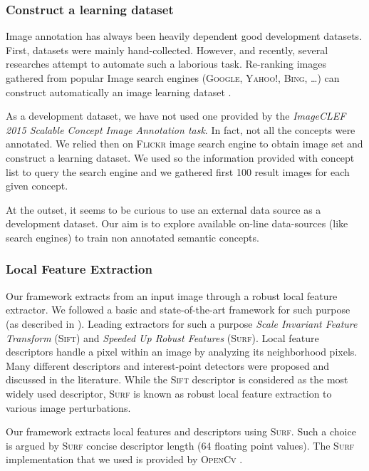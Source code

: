 			\subsubsection{Construct a learning dataset}
				\label{label1}
				Image annotation has always been heavily dependent  good development datasets. 
				First, datasets were mainly hand-collected. However, and recently, several researches 
				attempt to automate such a laborious task. Re-ranking images gathered from popular 
				Image search engines (\textsc{Google}, \textsc{Yahoo!}, \textsc{Bing}, \dots) 
				can construct automatically an image learning dataset \citep{Fergus2004,Fergus2005,Schroff2011}.

				As a development dataset, we have not used one provided by the \textit{ImageCLEF
				2015 Scalable Concept Image Annotation task}. In fact, not all the concepts were annotated. 
				We relied then on \textsc{Flickr} image search engine to obtain image set and construct 
				a learning dataset. We used so the information provided with concept list to 
				query the search engine and we gathered first 100 result images for each given concept.

				At the outset, it seems to be curious to use an external data source as a development dataset. 
				Our aim is to explore available on-line data-sources (like search engines) to train non 
				annotated semantic concepts.


			\subsubsection{Local Feature Extraction}
				Our framework extracts  from an input image through a robust local feature extractor.
				We followed a basic and state-of-the-art framework for such purpose (as described in \citep{Piras2014}).
				Leading extractors for such a purpose  \textit{Scale Invariant Feature 
				Transform} (\textsc{Sift}) and \textit{Speeded Up Robust Features} (\textsc{Surf}).
				Local feature descriptors handle a pixel within an image by analyzing 
				its neighborhood pixels. Many different descriptors and interest-point
				detectors were proposed and discussed in the literature. While the \textsc{Sift} 
				descriptor \citep{Lowe2004} is considered as the most widely used descriptor, 
				\textsc{Surf}  \citep{Bay2008} is known as robust local feature extraction
				to various image perturbations.

				Our framework extracts local features and descriptors using \textsc{Surf}. Such a choice is
				argued by \textsc{Surf} concise descriptor length (64 floating point values).
				The \textsc{Surf} implementation that we used is provided by 
				\textsc{OpenCv} \citep{Bradski2008}.

